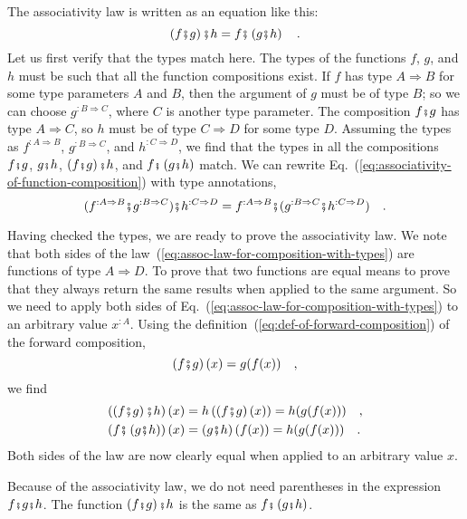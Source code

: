 The associativity law is written as an equation like this:
\begin{equation}
\left(f\bef g\right)\bef h=f\bef\left(g\bef h\right)\quad.\label{eq:associativity-of-function-composition}
\end{equation}
Let us first verify that the types match here. The types of the functions
$f$, $g$, and $h$ must be such that all the function compositions
exist. If $f$ has type $A\Rightarrow B$ for some type parameters
$A$ and $B$, then the argument of $g$ must be of type $B$; so
we can choose $g^{:B\Rightarrow C}$, where $C$ is another type parameter.
The composition $f\bef g$ has type $A\Rightarrow C$, so $h$ must
be of type $C\Rightarrow D$ for some type $D$. Assuming the types
as $f^{:A\Rightarrow B}$, $g^{:B\Rightarrow C}$, and $h^{:C\Rightarrow D}$,
we find that the types in all the compositions $f\bef g$, $g\bef h$,
$\left(f\bef g\right)\bef h$, and $f\bef\left(g\bef h\right)$ match.
We can rewrite Eq.~(\ref{eq:associativity-of-function-composition})
with type annotations, 
\begin{equation}
(f^{:A\Rightarrow B}\bef g^{:B\Rightarrow C})\bef h^{:C\Rightarrow D}=f^{:A\Rightarrow B}\bef(g^{:B\Rightarrow C}\bef h^{:C\Rightarrow D})\quad.\label{eq:assoc-law-for-composition-with-types}
\end{equation}

Having checked the types, we are ready to prove the associativity
law. We note that both sides of the law~(\ref{eq:assoc-law-for-composition-with-types})
are functions of type $A\Rightarrow D$. To prove that two functions
are equal means to prove that they always return the same results
when applied to the same argument. So we need to apply both sides
of Eq.~(\ref{eq:assoc-law-for-composition-with-types}) to an arbitrary
value $x^{:A}$. Using the definition~(\ref{eq:def-of-forward-composition})
of the forward composition, 
\[
\left(f\bef g\right)(x)=g(f(x))\quad,
\]
we find
\begin{align*}
\left(\left(f\bef g\right)\bef h\right)(x) & =h\left(\left(f\bef g\right)(x)\right)=h(g(f(x)))\quad,\\
\left(f\bef\left(g\bef h\right)\right)(x) & =\left(g\bef h\right)(f(x))=h(g(f(x)))\quad.
\end{align*}
Both sides of the law are now clearly equal when applied to an arbitrary
value $x$.

Because of the associativity law, we do not need parentheses in the
expression $f\bef g\bef h$. The function $\left(f\bef g\right)\bef h$
is the same as $f\bef\left(g\bef h\right)$.

